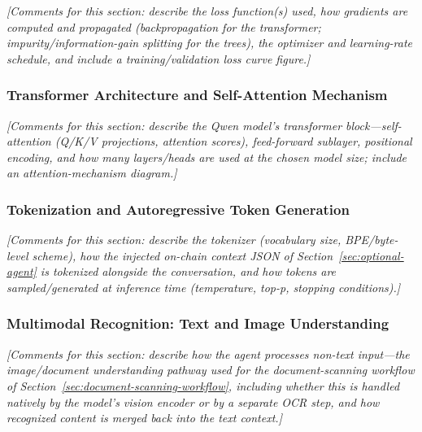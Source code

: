 \documentclass[12pt,a4paper]{report}
\begin{document}
\vspace{1.5cm}
\noindent\textit{[Comments for this section: describe the loss function(s) used, how gradients are computed and propagated (backpropagation for the transformer; impurity/information-gain splitting for the trees), the optimizer and learning-rate schedule, and include a training/validation loss curve figure.]}
\vspace{1.5cm}

\subsubsection{Transformer Architecture and Self-Attention Mechanism}
\label{sec:transformer-architecture}

\vspace{1.5cm}
\noindent\textit{[Comments for this section: describe the Qwen model's transformer block---self-attention (Q/K/V projections, attention scores), feed-forward sublayer, positional encoding, and how many layers/heads are used at the chosen model size; include an attention-mechanism diagram.]}
\vspace{1.5cm}

\subsubsection{Tokenization and Autoregressive Token Generation}
\label{sec:tokenization-generation}

\vspace{1.5cm}
\noindent\textit{[Comments for this section: describe the tokenizer (vocabulary size, BPE/byte-level scheme), how the injected on-chain context JSON of Section~\ref{sec:optional-agent} is tokenized alongside the conversation, and how tokens are sampled/generated at inference time (temperature, top-p, stopping conditions).]}
\vspace{1.5cm}

\subsubsection{Multimodal Recognition: Text and Image Understanding}
\label{sec:multimodal-recognition}

\vspace{1.5cm}
\noindent\textit{[Comments for this section: describe how the agent processes non-text input---the image/document understanding pathway used for the document-scanning workflow of Section~\ref{sec:document-scanning-workflow}, including whether this is handled natively by the model's vision encoder or by a separate OCR step, and how recognized content is merged back into the text context.]}
\vspace{1.5cm}
\end{document}

